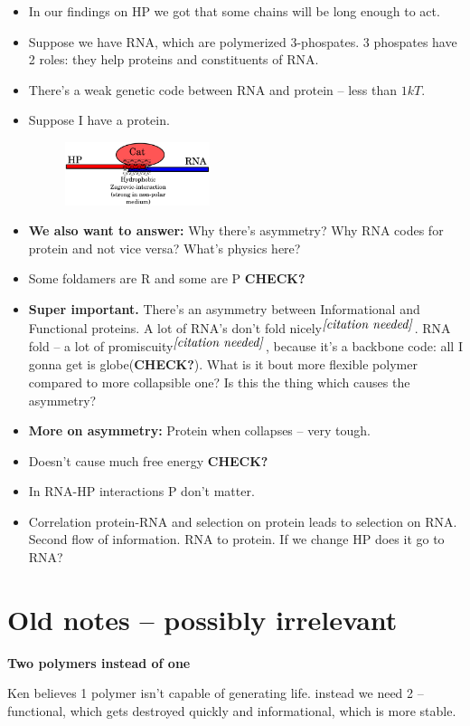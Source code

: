 \documentclass[12pt]{paper}
\newcommand{\ncite}{$^{\mbox{\textit{[citation needed]}}}$}
\begin{document}
\begin{itemize}
 \item In our findings on HP we got that some chains will be long enough to act.
 \item Suppose we have RNA, which are polymerized 3-phospates. 3 phospates have 2 roles: they help 
proteins and constituents of RNA.
\item There's a weak genetic code between RNA and protein -- less than $1 kT$. 
\item Suppose I have a protein. 
\begin{figure}[htb!]
 \centering
\includegraphics[width=0.4\textwidth]{pictures/2p1.pdf}
\end{figure}
\item \textbf{We also want to answer:}
\subitem Why there's asymmetry?
\subitem Why RNA codes for protein and not vice versa?
\subitem What's physics here?
\item Some foldamers are R and some are P \textbf{CHECK?}
\item \textbf{Super important.} There's an asymmetry between Informational and Functional 
proteins. A lot of RNA's don't fold nicely\ncite. RNA fold -- a lot of promiscuity\ncite, because 
it's a backbone code: all I gonna get is globe(\textbf{CHECK?}). What is it bout more flexible 
polymer compared to more collapsible one? Is this the thing which causes the asymmetry?
\item \textbf{More on asymmetry:} Protein when collapses -- very tough. 
\item Doesn't cause much free energy \textbf{CHECK?}
\item In RNA-HP interactions P don't matter.
\item Correlation protein-RNA and selection on protein leads to selection on RNA. Second flow of 
information. RNA to protein. If we change HP does it go to RNA?
\end{itemize}



\newpage
\appendix
\section{Old notes -- possibly irrelevant}
 \begin{center}
  {\Large \textbf{Two polymers instead of one}}
 \end{center}
Ken believes 1 polymer isn't capable of generating life.
instead we need 2 -- functional, which gets destroyed quickly and informational, which is more 
stable.
\end{document}
